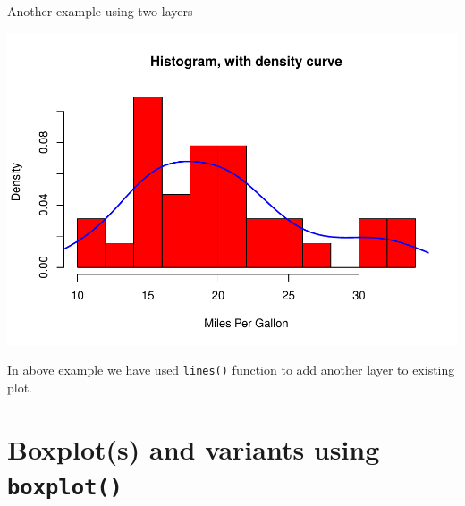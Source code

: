 \documentclass[
]{book}
\newenvironment{Shaded}{\begin{snugshade}}{\end{snugshade}}
\newcommand{\AttributeTok}[1]{\textcolor[rgb]{0.13,0.29,0.53}{#1}}
\newcommand{\CommentTok}[1]{\textcolor[rgb]{0.56,0.35,0.01}{\textit{#1}}}
\newcommand{\ConstantTok}[1]{\textcolor[rgb]{0.56,0.35,0.01}{#1}}
\newcommand{\DecValTok}[1]{\textcolor[rgb]{0.00,0.00,0.81}{#1}}
\newcommand{\FunctionTok}[1]{\textcolor[rgb]{0.13,0.29,0.53}{\textbf{#1}}}
\newcommand{\NormalTok}[1]{#1}
\newcommand{\SpecialCharTok}[1]{\textcolor[rgb]{0.81,0.36,0.00}{\textbf{#1}}}
\newcommand{\StringTok}[1]{\textcolor[rgb]{0.31,0.60,0.02}{#1}}
\begin{document}
Another example using two layers

\begin{Shaded}
\end{Shaded}

\begin{center}\includegraphics[height=0.55\textheight]{DauR_files/figure-latex/p12-1} \end{center}

In above example we have used \texttt{lines()} function to add another layer to existing plot.

\hypertarget{boxplots-and-variants-using-boxplot}{%
\section{\texorpdfstring{Boxplot(s) and variants using \texttt{boxplot()}}{Boxplot(s) and variants using boxplot()}}\label{boxplots-and-variants-using-boxplot}}
\end{document}
